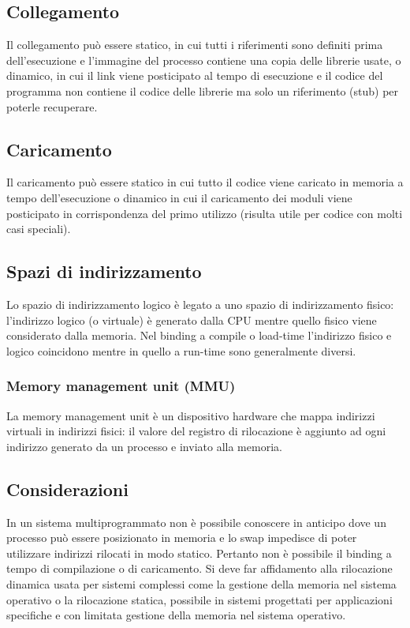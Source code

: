 \subsection{Collegamento}
Il collegamento pu\`o essere statico, in cui tutti i riferimenti sono definiti prima dell'esecuzione e l'immagine del processo contiene una copia delle librerie usate, o dinamico, in cui il
link viene posticipato al tempo di esecuzione e il codice del programma non contiene il codice delle librerie ma solo un riferimento (stub) per poterle recuperare. 
\subsection{Caricamento}
Il caricamento pu\`o essere statico in cui tutto il codice viene caricato in memoria a tempo dell'esecuzione o dinamico in cui il caricamento dei moduli viene posticipato in 
corrispondenza del primo utilizzo (risulta utile per codice con molti casi speciali).
\subsection{Spazi di indirizzamento}
Lo spazio di indirizzamento logico \`e legato a uno spazio di indirizzamento fisico: l'indirizzo logico (o virtuale) \`e generato dalla CPU mentre quello fisico viene considerato dalla
memoria. Nel binding a compile o load-time l'indirizzo fisico e logico coincidono mentre in quello a run-time sono generalmente diversi. 
\subsubsection{Memory management unit (MMU)}
La memory management unit \`e un dispositivo hardware che mappa indirizzi virtuali in indirizzi fisici: il valore del registro di rilocazione \`e aggiunto ad ogni indirizzo generato
da un processo e inviato alla memoria. 
\subsection{Considerazioni}
In un sistema multiprogrammato non \`e possibile conoscere in anticipo dove un processo pu\`o essere posizionato in memoria e lo swap impedisce di poter utilizzare indirizzi rilocati
in modo statico. Pertanto non \`e possibile il binding a tempo di compilazione o di caricamento. Si deve far affidamento alla rilocazione dinamica usata per sistemi complessi come la
gestione della memoria nel sistema operativo o la rilocazione statica, possibile in sistemi progettati per applicazioni specifiche e con limitata gestione della memoria nel sistema
operativo. 
